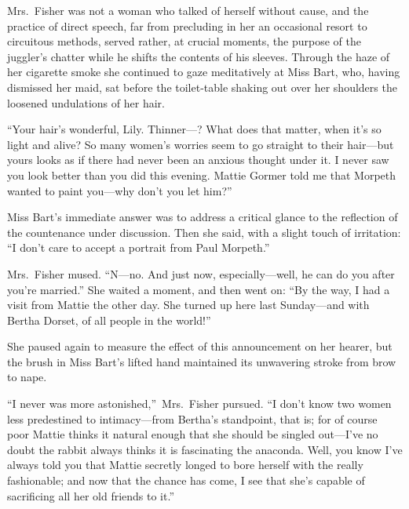 \documentclass[12pt,a4paper]{book}
\begin{document}
Mrs.\ Fisher was not a woman who talked of herself without cause,
and the practice of direct speech, far from precluding in her an
occasional resort to circuitous methods, served rather, at
crucial moments, the purpose of the juggler's chatter while he
shifts the contents of his sleeves. Through the haze of her
cigarette smoke she continued to gaze meditatively at Miss Bart,
who, having dismissed her maid, sat before the
toilet-table shaking out over her shoulders the loosened
undulations of her hair.





``Your hair's wonderful, Lily. Thinner---? What does that matter,
when it's so light and alive? So many women's worries seem to go
straight to their hair---but yours looks as if there had never
been an anxious thought under it. I never saw you look better
than you did this evening. Mattie Gormer told me that Morpeth
wanted to paint you---why don't you let him?''





Miss Bart's immediate answer was to address a critical glance to
the reflection of the countenance under discussion. Then she
said, with a slight touch of irritation: ``I don't care to accept
a portrait from Paul Morpeth.''





Mrs.\ Fisher mused. ``N---no. And just now, especially---well, he
can do you after you're married.'' She waited a moment, and then
went on: ``By the way, I had a visit from Mattie the other day. 
She turned up here last Sunday---and with Bertha Dorset, of all
people in the world!''





She paused again to measure the effect of this announcement on
her hearer, but the brush in Miss Bart's lifted hand maintained
its unwavering stroke from brow to nape.





``I never was more astonished,''\ Mrs.\ Fisher pursued. ``I don't know
two women less predestined to intimacy---from Bertha's standpoint,
that is; for of course poor Mattie thinks it natural enough that
she should be singled out---I've no doubt the rabbit always thinks
it is fascinating the anaconda. Well, you know I've always told
you that Mattie secretly longed to bore herself with the really
fashionable; and now that the chance has come, I see that she's
capable of sacrificing all her old friends to it.''
\end{document}
